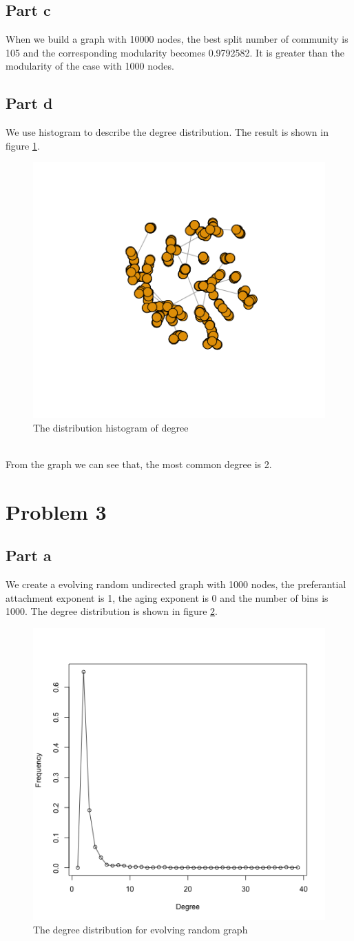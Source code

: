\documentclass{article}
\begin{document}
\subsection{Part c}
When we build a graph with 10000 nodes, the best split number of community is 105 and the corresponding modularity becomes 0.9792582.
It is greater than the modularity of the case with 1000 nodes.
\subsection{Part d}
We use histogram to describe the degree distribution. The result is shown in figure \ref{fig:p2_2}. \\
\begin{figure}[htbp]
\centering
\includegraphics[width=.6\textwidth]{p2_2.png}
\caption{The distribution histogram of degree}
\label{fig:p2_2}
\end{figure}
\\
From the graph we can see that, the most common degree is 2.
\section{Problem 3}
\subsection{Part a}
We create a evolving random undirected graph with 1000 nodes, the preferantial attachment exponent is 1, the aging exponent is 0 and the number of bins is 1000. The degree distribution is shown in figure \ref{fig:p3_1}.
\begin{figure}[htbp]
\centering
\includegraphics[width=.6\textwidth]{p3_1.png}
\caption{The degree distribution for evolving random graph}
\label{fig:p3_1}
\end{figure}
\end{document}
